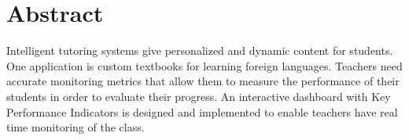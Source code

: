 \begingroup
\let\clearpage\relax
\let\cleardoublepage\relax
\let\cleardoublepage\relax

\chapter*{Abstract}
Intelligent tutoring systems give personalized and dynamic content for students. One application is custom textbooks for learning foreign languages. Teachers need accurate monitoring metrics that allow them to measure the performance of their students in order to evaluate their progress. An interactive dashboard with Key Performance Indicators is designed and implemented to enable teachers have real time monitoring of the class. 

\vfill
%

\endgroup

\vfill
